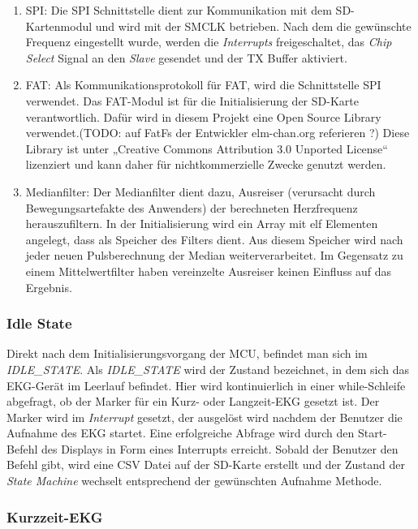 \begin{enumerate}
    \item SPI: Die SPI Schnittstelle dient zur Kommunikation mit dem SD-Kartenmodul und wird mit der SMCLK betrieben. Nach dem die gewünschte Frequenz eingestellt wurde, werden die \textit{Interrupts} freigeschaltet, das \textit{Chip Select} Signal an den \textit{Slave} gesendet und der TX Buffer aktiviert.
    \item FAT: Als Kommunikationsprotokoll für FAT, wird die Schnittstelle SPI verwendet. Das FAT-Modul ist für die Initialisierung der SD-Karte verantwortlich. Dafür wird in diesem Projekt eine Open Source Library verwendet.(TODO: auf FatFs der Entwickler elm-chan.org referieren ?) Diese Library ist unter „Creative Commons Attribution 3.0 Unported License“ lizenziert und kann daher für nichtkommerzielle Zwecke genutzt werden.
    \item Medianfilter: Der Medianfilter dient dazu, Ausreiser (verursacht durch Bewegungsartefakte des Anwenders) der berechneten Herzfrequenz herauszufiltern. In der Initialisierung wird ein Array mit elf Elementen angelegt, dass als Speicher des Filters dient. Aus diesem Speicher wird nach jeder neuen Pulsberechnung der Median weiterverarbeitet. Im Gegensatz zu einem Mittelwertfilter haben vereinzelte Ausreiser keinen Einfluss auf das Ergebnis.
\end{enumerate}

\subsubsection{Idle State}

Direkt nach dem Initialisierungsvorgang der MCU, befindet man sich im \textit{IDLE\_STATE}. 
Als \textit{IDLE\_STATE} wird der Zustand bezeichnet, in dem sich das EKG-Gerät im Leerlauf befindet. Hier wird kontinuierlich in einer while-Schleife abgefragt, ob der Marker für ein Kurz- oder Langzeit-EKG gesetzt ist. Der Marker wird im \textit{Interrupt} gesetzt, der ausgelöst wird nachdem der Benutzer die Aufnahme des EKG startet.
Eine erfolgreiche Abfrage wird durch den Start-Befehl des Displays in Form eines Interrupts erreicht. Sobald der Benutzer den Befehl gibt, wird eine CSV Datei auf der SD-Karte erstellt und der Zustand der \textit{State Machine} wechselt entsprechend der gewünschten Aufnahme Methode.

\subsubsection{Kurzzeit-EKG}

